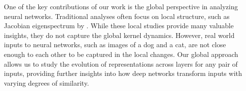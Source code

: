 \documentclass[twoside]{article}
\theoremstyle{definition}
\begin{document}

One of the key contributions of our work is the global perspective in analyzing neural networks. Traditional analyses often focus on local structure, such as Jacobian eigenspectrum by \citet{pennington2018emergence}. While these local studies provide many  valuable insights, they do not capture the global kernel dynamics. However, real world inputs to neural networks, such as images of a dog and a cat, are not close enough to each other to be captured in the local changes. Our global approach allows us to study the evolution of representations across layers for any pair of inputs, providing further insights into how deep networks transform inputs with varying degrees of similarity.


\end{document}
